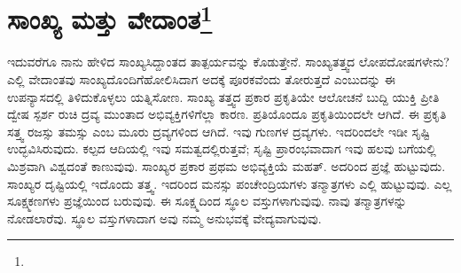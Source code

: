 
\chapter[ಸಾಂಖ್ಯ ಮತ್ತು ವೇದಾಂತ]{ಸಾಂಖ್ಯ ಮತ್ತು ವೇದಾಂತ\protect\footnote{}}

ಇದುವರೆಗೂ ನಾನು ಹೇಳಿದ ಸಾಂಖ್ಯಸಿದ್ದಾಂತದ ತಾತ್ಪರ್ಯವನ್ನು ಕೊಡುತ್ತೇನೆ. ಸಾಂಖ್ಯತತ್ತ್ವದ ಲೋಪದೋಷಗಳೇನು? ಎಲ್ಲಿ ವೇದಾಂತವು ಸಾಂಖ್ಯದೊಂದಿಗೆ\break ಹೋಲಿಸಿದಾಗ ಅದಕ್ಕೆ ಪೂರಕವೆಂದು ತೋರುತ್ತದೆ ಎಂಬುದನ್ನು ಈ ಉಪನ್ಯಾಸದಲ್ಲಿ ತಿಳಿದುಕೊಳ್ಳಲು ಯತ್ನಿಸೋಣ. ಸಾಂಖ್ಯ ತತ್ತ್ವದ ಪ್ರಕಾರ ಪ್ರಕೃತಿಯೇ ಆಲೋಚನೆ ಬುದ್ದಿ ಯುಕ್ತಿ ಪ್ರೀತಿ ದ್ವೇಷ ಸ್ಪರ್ಶ ರುಚಿ ದ್ರವ್ಯ ಮುಂತಾದ ಅಭಿವ್ಯಕ್ತಿಗಳಿಗೆಲ್ಲಾ ಕಾರಣ. ಪ್ರತಿಯೊಂದೂ ಪ್ರಕೃತಿಯಿಂದಲೇ ಆಗಿದೆ. ಈ ಪ್ರಕೃತಿ ಸತ್ತ್ವ ರಜಸ್ಸು ತಮಸ್ಸು ಎಂಬ ಮೂರು ದ್ರವ್ಯಗಳಿಂದ ಆಗಿದೆ. ಇವು ಗುಣಗಳ ದ್ರವ್ಯಗಳು. ಇದರಿಂದಲೇ ಇಡೀ ಸೃಷ್ಟಿ ಉದ್ಭವಿಸಿರುವುದು. ಕಲ್ಪದ ಆದಿಯಲ್ಲಿ ಇವು ಸಮತ್ವದಲ್ಲಿರುತ್ತವೆ; ಸೃಷ್ಟಿ ಪ್ರಾರಂಭವಾದಾಗ ಇವು ಹಲವು ಬಗೆಯಲ್ಲಿ ಮಿಶ್ರವಾಗಿ ವಿಶ್ವದಂತೆ ಕಾಣುವುವು. ಸಾಂಖ್ಯರ ಪ್ರಕಾರ ಪ್ರಥಮ ಅಭಿವ್ಯಕ್ತಿಯೆ ಮಹತ್. ಅದರಿಂದ ಪ್ರಜ್ಞೆ ಹುಟ್ಟುವುದು. ಸಾಂಖ್ಯರ ದೃಷ್ಟಿಯಲ್ಲಿ ಇದೊಂದು ತತ್ತ್ವ. ಇದರಿಂದ ಮನಸ್ಸು ಪಂಚೇಂದ್ರಿಯಗಳು ತನ್ಮಾತ್ರಗಳು ಎಲ್ಲಿ ಹುಟ್ಟುವುವು. ಎಲ್ಲ ಸೂಕ್ಷ್ಮಕಣಗಳು ಪ್ರಜ್ಞೆಯಿಂದ ಬರುವುವು. ಈ ಸೂಕ್ಷ್ಮದಿಂದ ಸ್ಥೂಲ ವಸ್ತುಗಳಾಗುವುವು. ನಾವು ತನ್ಮಾತ್ರಗಳನ್ನು ನೋಡಲಾರೆವು. ಸ್ಥೂಲ ವಸ್ತುಗಳಾದಾಗ ಅವು ನಮ್ಮ ಅನುಭವಕ್ಕೆ ವೇದ್ಯವಾಗುವುವು.

